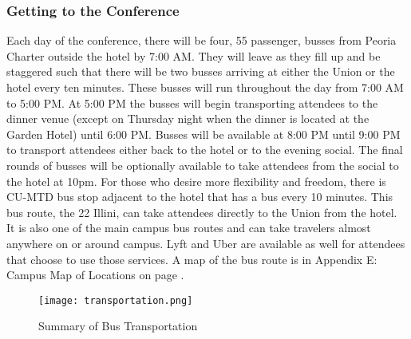 \subsubsection{Getting to the Conference}
Each day of the conference, there will be four, 55 passenger, busses from Peoria Charter outside the hotel by 7:00 AM. They will leave as they fill up and be staggered such that there will be two busses arriving at either the Union or the hotel every ten minutes. These busses will run throughout the day from 7:00 AM to 5:00 PM. At 5:00 PM the busses will begin transporting attendees to the dinner venue (except on Thursday night when the dinner is located at the Garden Hotel) until 6:00 PM. Busses will be available at 8:00 PM until 9:00 PM to transport attendees either back to the hotel or to the evening social. The final rounds of busses will be optionally available to take attendees from the social to the hotel at 10pm. For those who desire more flexibility and freedom, there is CU-MTD bus stop adjacent to the hotel that has a bus every 10 minutes. This bus route, the 22 Illini, can take attendees directly to the Union from the hotel. It is also one of the main campus bus routes and can take travelers almost anywhere on or around campus. Lyft and Uber are available as well for attendees that choose to use those services. A map of the bus route is in Appendix E: Campus Map of Locations on page \pageref{appendix:map}.
\begin{figure}[H]
	\centering
	\label{figure:busses}
	\texttt{[image: transportation.png]}
	\caption{Summary of Bus Transportation}
\end{figure}

